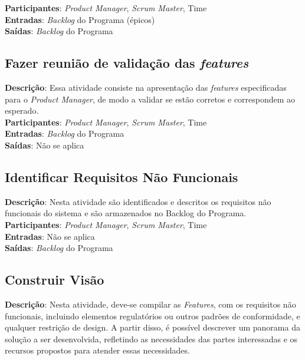 \textbf{Participantes}: \textit{Product Manager}, \textit{Scrum Master}, Time \\

\textbf{Entradas}: \textit{Backlog} do Programa (épicos) \\

\textbf{Saídas}:   \textit{Backlog} do Programa \\

\subsection{Fazer reunião de validação das \textit{features}}
  \textbf{Descrição}: Essa atividade consiste na apresentação das \textit{features} especificadas para o \textit{Product Manager}, de modo a validar se 
  estão corretos e correspondem ao esperado.  \\
  
  \textbf{Participantes}: \textit{Product Manager}, \textit{Scrum Master}, Time \\
  
  \textbf{Entradas}: \textit{Backlog} do Programa \\
  
  \textbf{Saídas}:  Não se aplica\\
  
\subsection{Identificar Requisitos Não Funcionais}
  \textbf{Descrição}: Nesta atividade são identificados e descritos os requisitos não funcionais do sistema e são armazenados no Backlog do Programa.  \\
  
  \textbf{Participantes}: \textit{Product Manager}, \textit{Scrum Master}, Time \\
  
  \textbf{Entradas}:  Não se aplica\\
  
  \textbf{Saídas}:  \textit{Backlog} do Programa\\

\subsection{Construir Visão}
  \textbf{Descrição}: Nesta atividade, deve-se compilar as \textit{Features}, com os requisitos não funcionais, incluindo elementos 
  regulatórios ou outros padrões de conformidade, e qualquer restrição de design. A partir disso, é possível descrever um panorama da solução a 
  ser desenvolvida, refletindo as necessidades das partes interessadas e os recursos propostos para atender essas necessidades. \\
  
